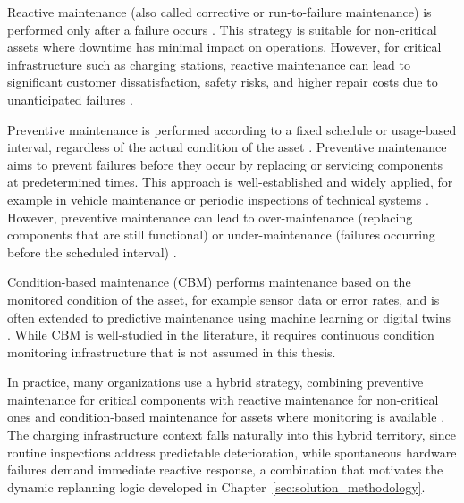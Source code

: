 \documentclass[12pt,oneside]{article}
\begin{document}
Reactive maintenance (also called corrective or run-to-failure maintenance) is performed only after
a failure occurs \citep{molkeda2023corrective}.
This strategy is suitable for non-critical assets where downtime has minimal impact on operations.
However, for critical infrastructure such as charging stations, reactive maintenance can lead to
significant customer dissatisfaction, safety risks, and higher repair costs due to unanticipated
failures \citep{dejonge2020review}.

Preventive maintenance is performed according to a fixed schedule or usage-based interval,
regardless of the actual condition of the asset \citep{molkeda2023corrective, alaswad2017review}.
Preventive maintenance aims to prevent failures before they occur by replacing or servicing
components at predetermined times.
This approach is well-established and widely applied, for example in vehicle maintenance or periodic
inspections of technical systems \citep{dekker1996applications}.
However, preventive maintenance can lead to over-maintenance (replacing components that are still
functional) or under-maintenance (failures occurring before the scheduled interval) \citep{dejonge2020review}.

Condition-based maintenance (CBM) performs maintenance based on the monitored condition of the asset, for example sensor data or error rates, and is often extended to predictive maintenance using machine learning or digital twins \citep{alaswad2017review}.
While CBM is well-studied in the literature, it requires continuous condition monitoring infrastructure that is not assumed in this thesis.

In practice, many organizations use a hybrid strategy, combining preventive maintenance for critical
components with reactive maintenance for non-critical ones and condition-based maintenance for
assets where monitoring is available \citep{dejonge2020review}.
The charging infrastructure context falls naturally into this hybrid territory, since routine inspections address predictable deterioration, while spontaneous hardware failures demand immediate reactive response, a combination that motivates the dynamic replanning logic developed in Chapter~\ref{sec:solution_methodology}.
\end{document}
